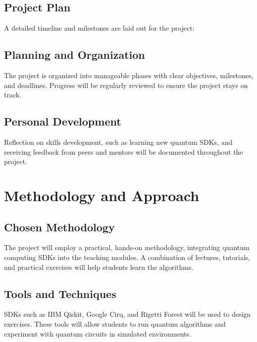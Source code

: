 \documentclass[11pt,a4paper]{article}
\begin{document}
\subsection{Project Plan}

A detailed timeline and milestones are laid out for the project:


\subsection{Planning and Organization}

The project is organized into manageable phases with clear objectives, milestones, and deadlines.
Progress will be regularly reviewed to ensure the project stays on track.

\subsection{Personal Development}

Reflection on skills development, such as learning new quantum SDKs, and receiving feedback from peers and mentors will be documented throughout the project.

\section{Methodology and Approach}

\subsection{Chosen Methodology}

The project will employ a practical, hands-on methodology, integrating quantum computing SDKs into the teaching modules.
A combination of lectures, tutorials, and practical exercises will help students learn the algorithms.

\subsection{Tools and Techniques}

SDKs such as IBM Qiskit, Google Cirq, and Rigetti Forest will be used to design exercises.
These tools will allow students to run quantum algorithms and experiment with quantum circuits in simulated environments.
\end{document}
